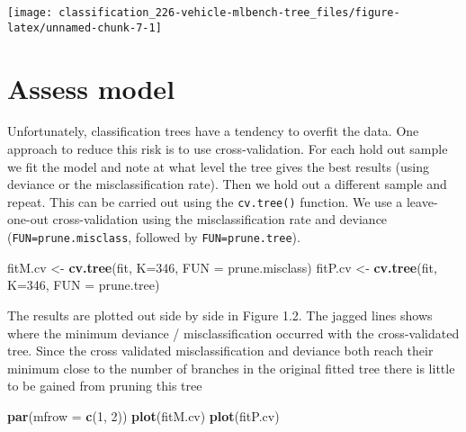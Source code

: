 \documentclass[]{book}
\newenvironment{Shaded}{\begin{snugshade}}{\end{snugshade}}
\newcommand{\DataTypeTok}[1]{\textcolor[rgb]{0.13,0.29,0.53}{#1}}
\newcommand{\DecValTok}[1]{\textcolor[rgb]{0.00,0.00,0.81}{#1}}
\newcommand{\KeywordTok}[1]{\textcolor[rgb]{0.13,0.29,0.53}{\textbf{#1}}}
\newcommand{\NormalTok}[1]{#1}
\newcommand{\StringTok}[1]{\textcolor[rgb]{0.31,0.60,0.02}{#1}}
\begin{document}
\begin{center}\texttt{[image: classification\_226-vehicle-mlbench-tree\_files/figure-latex/unnamed-chunk-7-1]} \end{center}

\hypertarget{assess-model}{%
\section{Assess model}\label{assess-model}}

Unfortunately, classification trees have a tendency to overfit the data. One
approach to reduce this risk is to use cross-validation. For each hold out
sample we fit the model and note at what level the tree gives the best results
(using deviance or the misclassification rate). Then we hold out a different
sample and repeat. This can be carried out using the \texttt{cv.tree()} function.
We use a leave-one-out cross-validation using the misclassification rate and
deviance (\texttt{FUN=prune.misclass}, followed by \texttt{FUN=prune.tree}).

\begin{Shaded}
\begin{Highlighting}[]
\NormalTok{fitM.cv <-}\StringTok{ }\KeywordTok{cv.tree}\NormalTok{(fit, }\DataTypeTok{K=}\DecValTok{346}\NormalTok{, }\DataTypeTok{FUN =}\NormalTok{ prune.misclass)}
\NormalTok{fitP.cv <-}\StringTok{ }\KeywordTok{cv.tree}\NormalTok{(fit, }\DataTypeTok{K=}\DecValTok{346}\NormalTok{, }\DataTypeTok{FUN =}\NormalTok{ prune.tree)}
\end{Highlighting}
\end{Shaded}

The results are plotted out side by side in Figure 1.2. The jagged lines
shows where the minimum deviance / misclassification occurred with the
cross-validated tree. Since the cross validated misclassification and deviance
both reach their minimum close to the number of branches in the original
fitted tree there is little to be gained from pruning this tree

\begin{Shaded}
\begin{Highlighting}[]
\KeywordTok{par}\NormalTok{(}\DataTypeTok{mfrow =} \KeywordTok{c}\NormalTok{(}\DecValTok{1}\NormalTok{, }\DecValTok{2}\NormalTok{))}
\KeywordTok{plot}\NormalTok{(fitM.cv)}
\KeywordTok{plot}\NormalTok{(fitP.cv)}
\end{Highlighting}
\end{Shaded}
\end{document}

